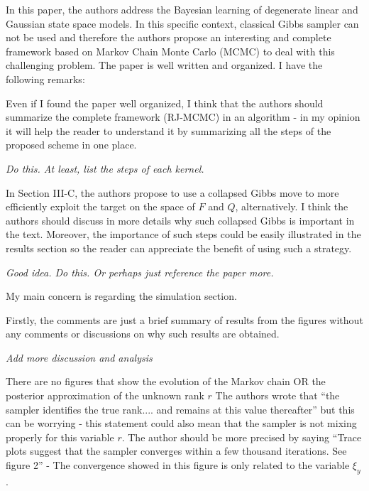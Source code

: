 \documentclass{article}
\newenvironment{review}[0]{\begin{itshape}\color{Gray}\noindent}{\end{itshape}\vspace{0.4cm}}
\newenvironment{response}[0]{\noindent}{\vspace{0.4cm}}
\newcommand{\meta}[1]{{\color{red}\em #1}}
\begin{document}
\begin{review}
In this paper, the authors address the Bayesian learning of degenerate linear and Gaussian state space models. In this specific context, classical Gibbs sampler can not be used and therefore the authors propose an interesting and complete framework based on Markov Chain Monte Carlo (MCMC) to deal with this challenging problem. The paper is well written and organized. I have the following remarks:

Even if I found the paper well organized, I think that the authors should summarize the complete framework (RJ-MCMC) in an algorithm - in my opinion it will help the reader to understand it by summarizing all the steps of the proposed scheme in one place.
\end{review}

\begin{response}
 \meta{Do this. At least, list the steps of each kernel.}
\end{response}

\begin{review}
In Section III-C, the authors propose to use a collapsed Gibbs move to more efficiently exploit the target on the space of $F$ and $Q$, alternatively. I think the authors should discuss in more details why such collapsed Gibbs is important in the text. Moreover, the importance of such steps could be easily illustrated in the results section so the reader can appreciate the benefit of using such a strategy.
\end{review}

\begin{response}
 \meta{Good idea. Do this. Or perhaps just reference the paper more.}
\end{response}

\begin{review}
My main concern is regarding the simulation section.

Firstly, the comments are just a brief summary of results from the figures without any comments or discussions on why such results are obtained.
\end{review}

\begin{response}
 \meta{Add more discussion and analysis}
\end{response}

\begin{review}
There are no figures that show the evolution of the Markov chain OR the posterior approximation of the unknown rank $r$
The authors wrote that ``the sampler identifies the true rank.... and remains at this value thereafter'' but this can be worrying - this statement could also mean that the sampler is not mixing properly for this variable $r$. The author should be more precised by saying ``Trace plots suggest that the sampler converges within a few thousand iterations. See figure 2'' - The convergence showed in this figure is only related to the variable $\xi_y$.
\end{review}
\end{document}
